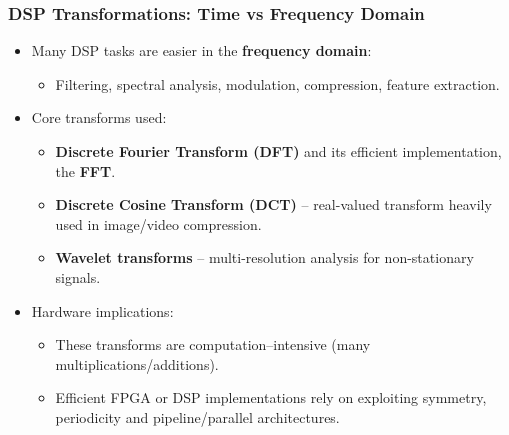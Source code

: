 \begin{frame}
	\frametitle{DSP Transformations: Time vs Frequency Domain}
	\begin{itemize}
		\item Many DSP tasks are easier in the \textbf{frequency domain}:
		\begin{itemize}
			\item Filtering, spectral analysis, modulation, compression, feature extraction.
		\end{itemize}
		\item Core transforms used:
		\begin{itemize}
			\item \textbf{Discrete Fourier Transform (DFT)} and its efficient implementation, the \textbf{FFT}.
			\item \textbf{Discrete Cosine Transform (DCT)} – real-valued transform heavily used in image/video compression.
			\item \textbf{Wavelet transforms} – multi-resolution analysis for non-stationary signals.
		\end{itemize}
		\item Hardware implications:
		\begin{itemize}
			\item These transforms are computation–intensive (many multiplications/additions).
			\item Efficient FPGA or DSP implementations rely on exploiting symmetry, periodicity and pipeline/parallel architectures.
		\end{itemize}
	\end{itemize}
\end{frame}

